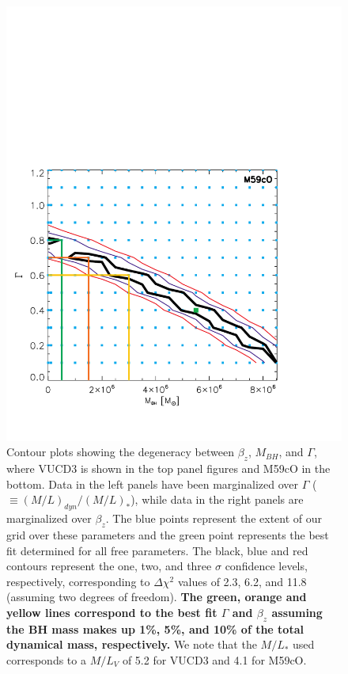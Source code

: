 \documentclass{aastex}
\begin{document}
\begin{figure}[ht!]
\begin{minipage}{0.45\textwidth}
    \includegraphics[trim={0 0 0.22cm 10cm},clip,scale=0.44]{m59co_mlmbh.pdf}%
  \end{minipage}
  
    
  \caption{Contour plots showing the degeneracy between $\beta_z$, $M_{BH}$, and $\Gamma$, where VUCD3 is shown in the top panel figures and M59cO in the bottom. Data in the left panels have been marginalized over $\Gamma$ ($\equiv (M/L)_{dyn}/(M/L)_{*}$), while data in the right panels are marginalized over $\beta_z$.  The blue points represent the extent of our grid over these parameters and the green point represents the best fit determined for all free parameters. The black, blue and red contours represent the one, two, and three $\sigma$ confidence levels, respectively, corresponding to $\Delta \chi^2$ values of 2.3, 6.2, and 11.8 (assuming two degrees of freedom).  \textbf{The green, orange and yellow lines correspond to the best fit $\Gamma$ and $\beta_z$ assuming the BH mass makes up 1\%, 5\%, and 10\% of the total dynamical mass, respectively.} We note that the $M/L_{*}$ used corresponds to a $M/L_V$ of 5.2 for VUCD3 and 4.1 for M59cO.}
  
  \label{fig:contour}
\end{figure}
\end{document}
